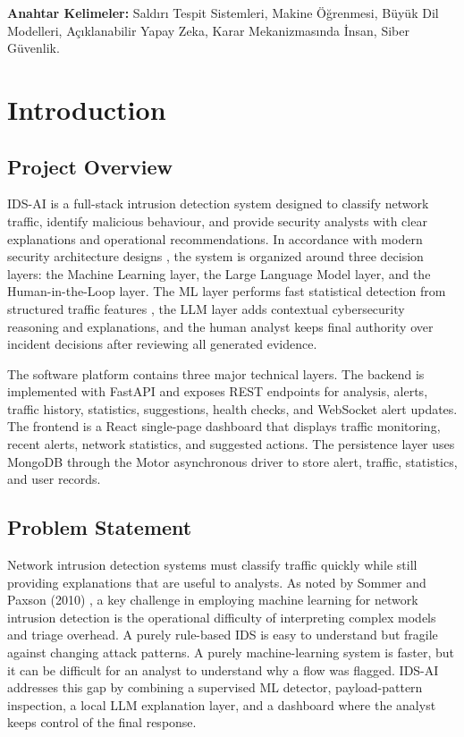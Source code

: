 \documentclass[12pt,a4paper]{report}
\begin{document}
\vspace{1.5cm}
\noindent\textbf{Anahtar Kelimeler:} Saldırı Tespit Sistemleri, Makine Öğrenmesi, Büyük Dil Modelleri, Açıklanabilir Yapay Zeka, Karar Mekanizmasında İnsan, Siber Güvenlik.

\clearpage

\tableofcontents
\clearpage
\listoffigures
\listoftables
\clearpage
{}

\chapter{Introduction}

\section{Project Overview}

IDS-AI is a full-stack intrusion detection system designed to classify network traffic, identify malicious behaviour, and provide security analysts with clear explanations and operational recommendations. In accordance with modern security architecture designs \cite{buczak2016}, the system is organized around three decision layers: the Machine Learning layer, the Large Language Model layer, and the Human-in-the-Loop layer. The ML layer performs fast statistical detection from structured traffic features \cite{sharafaldin2018}, the LLM layer adds contextual cybersecurity reasoning and explanations, and the human analyst keeps final authority over incident decisions after reviewing all generated evidence.

The software platform contains three major technical layers. The backend is implemented with FastAPI and exposes REST endpoints for analysis, alerts, traffic history, statistics, suggestions, health checks, and WebSocket alert updates. The frontend is a React single-page dashboard that displays traffic monitoring, recent alerts, network statistics, and suggested actions. The persistence layer uses MongoDB through the Motor asynchronous driver to store alert, traffic, statistics, and user records.

\section{Problem Statement}

Network intrusion detection systems must classify traffic quickly while still providing explanations that are useful to analysts. As noted by Sommer and Paxson (2010) \cite{sommer2010}, a key challenge in employing machine learning for network intrusion detection is the operational difficulty of interpreting complex models and triage overhead. A purely rule-based IDS is easy to understand but fragile against changing attack patterns. A purely machine-learning system is faster, but it can be difficult for an analyst to understand why a flow was flagged. IDS-AI addresses this gap by combining a supervised ML detector, payload-pattern inspection, a local LLM explanation layer, and a dashboard where the analyst keeps control of the final response.
\end{document}
